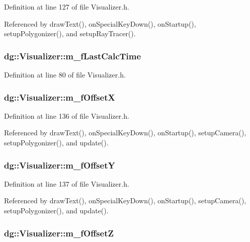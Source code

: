 Definition at line 127 of file Visualizer.h.

Referenced by draw\-Text(), on\-Special\-Key\-Down(), on\-Startup(), setup\-Polygonizer(), and setup\-Ray\-Tracer().
\subsubsection{ dg::Visualizer::m\_\-f\-Last\-Calc\-Time\hspace{0.3cm}{\tt  [protected]}}\label{classdg_1_1Visualizer_n0}




Definition at line 80 of file Visualizer.h.
\subsubsection{ dg::Visualizer::m\_\-f\-Offset\-X\hspace{0.3cm}{\tt  [protected]}}\label{classdg_1_1Visualizer_n30}




Definition at line 136 of file Visualizer.h.

Referenced by draw\-Text(), on\-Special\-Key\-Down(), on\-Startup(), setup\-Camera(), setup\-Polygonizer(), and update().
\subsubsection{ dg::Visualizer::m\_\-f\-Offset\-Y\hspace{0.3cm}{\tt  [protected]}}\label{classdg_1_1Visualizer_n31}




Definition at line 137 of file Visualizer.h.

Referenced by draw\-Text(), on\-Special\-Key\-Down(), on\-Startup(), setup\-Camera(), setup\-Polygonizer(), and update().
\subsubsection{ dg::Visualizer::m\_\-f\-Offset\-Z\hspace{0.3cm}{\tt  [protected]}}\label{classdg_1_1Visualizer_n32}




